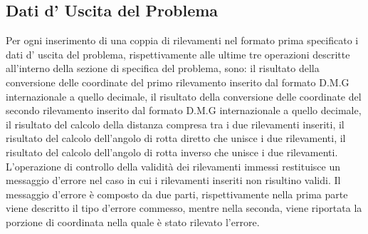 \documentclass{article}
\begin{document}
\subsection{Dati d' Uscita del Problema}
Per ogni inserimento di una coppia di rilevamenti nel formato prima specificato i dati d' uscita del problema, rispettivamente alle ultime tre operazioni descritte all'interno della sezione di specifica del problema, sono: il risultato della conversione delle coordinate del primo rilevamento inserito dal formato D.M.G internazionale a quello decimale, il risultato della conversione delle coordinate del secondo rilevamento inserito dal formato D.M.G internazionale a quello decimale, il risultato del calcolo della distanza compresa tra i due rilevamenti inseriti, il risultato del calcolo dell'angolo di rotta diretto che unisce i due rilevamenti, il risultato del calcolo dell'angolo di rotta inverso che unisce i due rilevamenti. 
L'operazione di controllo della validità dei rilevamenti immessi restituisce un messaggio d'errore nel caso in cui i rilevamenti inseriti non risultino validi. Il messaggio d'errore è composto da due parti, rispettivamente nella prima parte viene descritto il tipo d'errore commesso, mentre nella seconda, viene riportata la porzione di coordinata nella quale è stato rilevato l'errore. 
\end{document}
